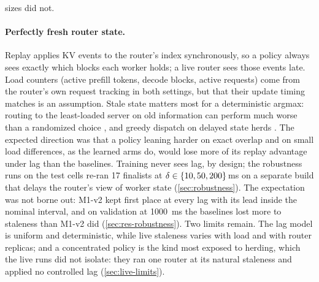 sizes did not.

\paragraph{Perfectly fresh router state.}
Replay applies KV events to the router's index synchronously, so a policy always sees exactly which
blocks each worker holds; a live router sees those events late. Load counters (active prefill
tokens, decode blocks, active requests) come from the router's own request tracking in both
settings, but that their update timing matches is an assumption. Stale state matters most for a
deterministic argmax: routing to the least-loaded server on old information can perform much
worse than a randomized choice \citep{mitzenmacher1998old}, and greedy dispatch on delayed state
herds \citep{tahir2022meanfield}. The expected direction was that a policy leaning harder on exact
overlap and on small load differences, as the learned arms do, would lose more of its replay
advantage under lag than the baselines. Training never sees lag, by design; the robustness runs on
the test cells re-ran 17 finalists at $\delta \in \{10, 50, 200\}$\,ms on a separate build that delays the router's
view of worker state (\cref{sec:robustness}). The expectation was not borne out: M1-v2 kept first
place at every lag with its lead inside the nominal interval, and on validation at \SI{1000}{ms}
the baselines lost more to staleness than M1-v2 did (\cref{sec:res-robustness}). Two limits remain. The lag model is uniform and
deterministic, while live staleness varies with load and with router replicas; and a concentrated
policy is the kind most exposed to herding, which the live runs did not isolate: they ran one router
at its natural staleness and applied no controlled lag (\cref{sec:live-limits}).

